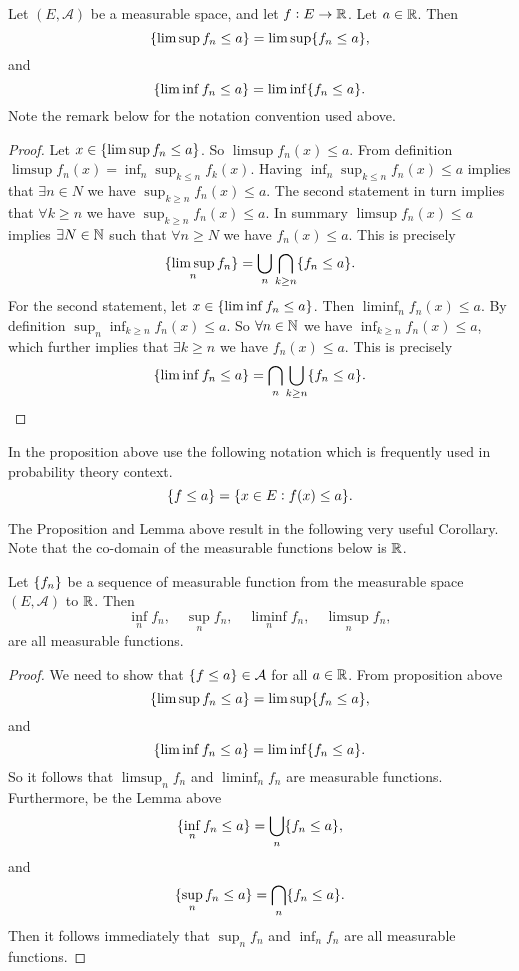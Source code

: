 \begin{proposition}
	Let $ (E,\mathcal{A}) $ be a measurable space, and let $ f: E \to \mathbb{R} $. Let $ a \in \mathbb{R} $. Then
	\[ \{\limsup f_n \leq a\} = \limsup \{f_n \leq a\}, \]
	and 
	\[ \{\liminf f_n \leq a\} = \liminf \{f_n \leq a\}. \]
	Note the remark below for the notation convention used above.
\end{proposition}
\begin{proof}
	Let $ x \in \{\limsup f_n \leq a\} $. So $ \limsup f_n(x) \leq a $. From definition $ \limsup f_n(x) = \inf_{n}\sup_{k\leq n} f_k(x) $. Having $ \inf_n \sup_{k\leq n} f_n(x) \leq a $ implies that $ \exists n \in N $ we have $ \sup_{k\geq n} f_n(x) \leq a $. The second statement in turn implies that $ \forall k \geq n  $ we have $ \sup_{k\geq n} f_n(x) \leq a $. In summary $ \limsup f_n(x)\leq a $ implies $ \exists N \in \mathbb{N} $ such that $ \forall n\geq N $ we have $ f_n(x) \leq a $. This is precisely
	\[ \{\limsup_n f_n\} = \bigcup_n \bigcap_{k\geq n} \{f_n \leq a\}. \] 
	For the second statement, let $ x \in \{\liminf f_n \leq a\} $. Then $ \liminf_n f_n(x)\leq a $. By definition $ \sup_{n}\inf_{k\geq n} f_n(x) \leq a $. So $ \forall n \in \mathbb{N} $ we have $ \inf_{k\geq n} f_n(x)\leq a $, which further implies that $ \exists k \geq n $ we have $ f_n(x) \leq a $. This is precisely
	\[ \{\liminf f_n \leq a\} = \bigcap_n \bigcup_{k\geq n} \{f_n \leq a\}.  \] 
\end{proof}


\begin{remark}
	In the proposition above use the following notation which is frequently used in probability theory context.
	\[ \{f \leq a\} = \{x \in E: f(x)\leq a\}. \]
\end{remark}


The Proposition and Lemma above result in the following very useful Corollary. Note that the co-domain of the measurable functions below is $ \mathbb{R} $.

\begin{corollary}
	Let $ \{f_n\} $ be a sequence of measurable function from the measurable space $ (E,\mathcal{A}) $ to $ \mathbb{R} $. Then
	\[ \inf_n f_n,\quad \sup_n f_n,\quad \liminf_n f_n,\quad \limsup_n f_n, \]
	are all measurable functions.
\end{corollary}
\begin{proof}
	We need to show that $ \{f\leq a\} \in \mathcal{A} $ for all $ a\in \mathbb{R} $. From proposition above 
	\[ \{\limsup f_n \leq a\} = \limsup \{f_n \leq a\}, \]
	and 
	\[ \{\liminf f_n \leq a\} = \liminf \{f_n \leq a\}. \]
	So it follows that $ \limsup_n f_n $ and $ \liminf_n f_n $ are measurable functions. Furthermore, be the Lemma above
	\[ \{\inf_n f_n \leq a\} = \bigcup_n \{f_n \leq a\}, \]
	and
	\[ \{\sup_n f_n \leq a\} = \bigcap_n \{f_n \leq a\}. \]
	Then it follows immediately that $ \sup_n f_n $ and $ \inf_n f_n $ are all measurable functions.
\end{proof}

